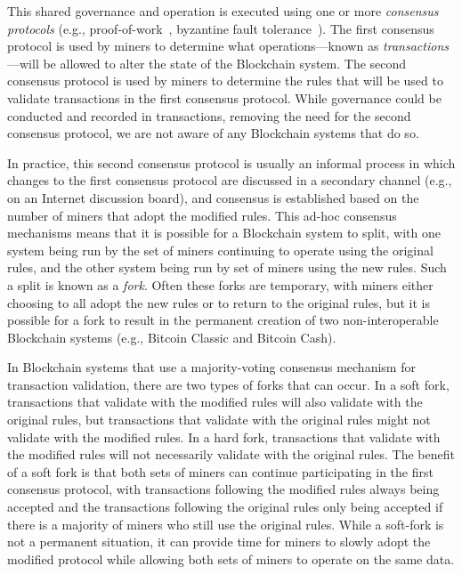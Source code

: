 This shared governance and operation is executed using one or more \emph{consensus protocols} (e.g., proof-of-work~\cite{DN93,back1997partial,NakamotoS8}, byzantine fault tolerance~\cite{castro1999practical}).
The first consensus protocol is used by miners to determine what operations---known as \emph{transactions}---will be allowed to alter the state of the Blockchain system.
The second consensus protocol is used by miners to determine the rules that will be used to validate transactions in the first consensus protocol.
While governance could be conducted and recorded in transactions, removing the need for the second consensus protocol, we are not aware of any Blockchain systems that do so.

In practice, this second consensus protocol is usually an informal process in which changes to the first consensus protocol are discussed in a secondary channel (e.g., on an Internet discussion board), and consensus is established based on the number of miners that adopt the modified rules.
This ad-hoc consensus mechanisms means that it is possible for a Blockchain system to split, with one system being run by the set of miners continuing to operate using the original rules, and the other system being run by set of miners using the new rules.
Such a split is known as a \emph{fork}.
Often these forks are temporary, with miners either choosing to all adopt the new rules or to return to the original rules, but it is possible for a fork to result in the permanent creation of two non-interoperable Blockchain systems (e.g., Bitcoin Classic and Bitcoin Cash).

In Blockchain systems that use a majority-voting consensus mechanism for transaction validation, there are two types of forks that can occur.
In a soft fork, transactions that validate with the modified rules will also validate with the original rules, but transactions that validate with the original rules might not validate with the modified rules.
In a hard fork, transactions that validate with the modified rules will not necessarily validate with the original rules.
The benefit of a soft fork is that both sets of miners can continue participating in the first consensus protocol, with transactions following the modified rules always being accepted and the transactions following the original rules only being accepted if there is a majority of miners who still use the original rules.
While a soft-fork is not a permanent situation, it can provide time for miners to slowly adopt the modified protocol while allowing both sets of miners to operate on the same data.

